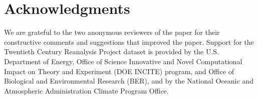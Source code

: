 \documentclass[utf8]{frontiersSCNS} %
\begin{document}
\section*{Acknowledgments}
We are grateful to the two anonymous reviewers of the paper for their constructive comments and suggestions that improved the paper. Support for the Twentieth Century Reanalysis Project dataset is provided by the U.S. Department of Energy, Office of Science Innovative and Novel Computational Impact on Theory and Experiment (DOE INCITE) program, and Office of Biological and Environmental Research (BER), and by the National Oceanic and Atmospheric Administration Climate Program Office.





\end{document}
